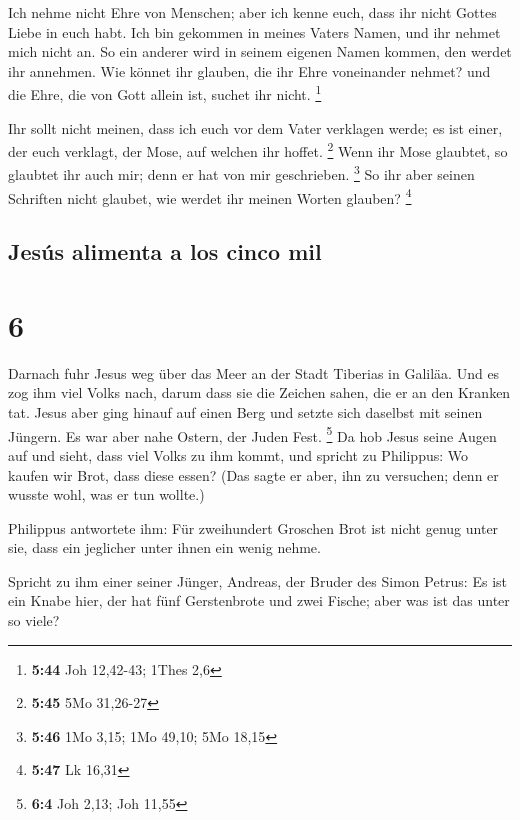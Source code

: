  Ich nehme nicht Ehre von Menschen;  aber
ich kenne euch, dass ihr nicht Gottes Liebe in euch habt.
 Ich bin gekommen in meines Vaters Namen, und ihr nehmet
mich nicht an. So ein anderer wird in seinem eigenen Namen kommen, den
werdet ihr annehmen.  Wie könnet ihr glauben, die ihr
Ehre voneinander nehmet? und die Ehre, die von Gott allein ist, suchet
ihr nicht. \footnote{\textbf{5:44} Joh 12,42-43; 1Thes 2,6}

 Ihr sollt nicht meinen, dass ich euch vor dem Vater
verklagen werde; es ist einer, der euch verklagt, der Mose, auf welchen
ihr hoffet. \footnote{\textbf{5:45} 5Mo 31,26-27}  Wenn
ihr Mose glaubtet, so glaubtet ihr auch mir; denn er hat von mir
geschrieben. \footnote{\textbf{5:46} 1Mo 3,15; 1Mo 49,10; 5Mo 18,15}
 So ihr aber seinen Schriften nicht glaubet, wie werdet
ihr meinen Worten glauben? \footnote{\textbf{5:47} Lk 16,31}

\hypertarget{jesuxfas-alimenta-a-los-cinco-mil}{%
\subsection{Jesús alimenta a los cinco
mil}\label{jesuxfas-alimenta-a-los-cinco-mil}}

\hypertarget{section-5}{%
\section{6}\label{section-5}}

 Darnach fuhr Jesus weg über das Meer an der Stadt
Tiberias in Galiläa.  Und es zog ihm viel Volks nach,
darum dass sie die Zeichen sahen, die er an den Kranken tat.
 Jesus aber ging hinauf auf einen Berg und setzte sich
daselbst mit seinen Jüngern.  Es war aber nahe Ostern, der
Juden Fest. \footnote{\textbf{6:4} Joh 2,13; Joh 11,55} 
Da hob Jesus seine Augen auf und sieht, dass viel Volks zu ihm kommt,
und spricht zu Philippus: Wo kaufen wir Brot, dass diese essen?
 (Das sagte er aber, ihn zu versuchen; denn er wusste
wohl, was er tun wollte.)

 Philippus antwortete ihm: Für zweihundert Groschen Brot
ist nicht genug unter sie, dass ein jeglicher unter ihnen ein wenig
nehme.

 Spricht zu ihm einer seiner Jünger, Andreas, der Bruder
des Simon Petrus:  Es ist ein Knabe hier, der hat fünf
Gerstenbrote und zwei Fische; aber was ist das unter so viele?

